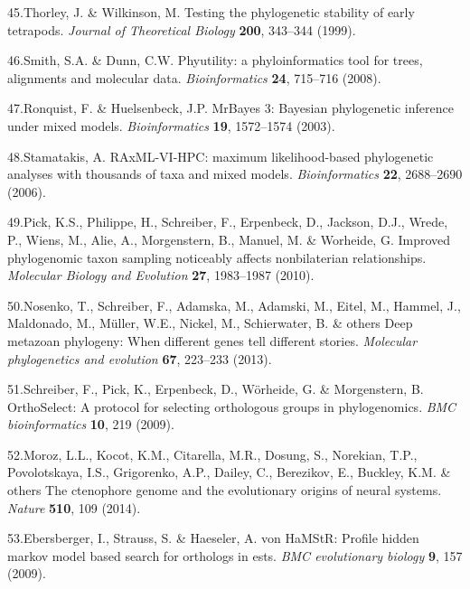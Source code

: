 \documentclass[]{article}
\begin{document}
\leavevmode\hypertarget{ref-Thorley:1999kg}{}%
45.Thorley, J. \& Wilkinson, M. Testing the phylogenetic stability of
early tetrapods. \emph{Journal of Theoretical Biology} \textbf{200},
343--344 (1999).

\leavevmode\hypertarget{ref-Smith:2008gb}{}%
46.Smith, S.A. \& Dunn, C.W. Phyutility: a phyloinformatics tool for
trees, alignments and molecular data. \emph{Bioinformatics} \textbf{24},
715--716 (2008).

\leavevmode\hypertarget{ref-Ronquist:2003hx}{}%
47.Ronquist, F. \& Huelsenbeck, J.P. MrBayes 3: Bayesian phylogenetic
inference under mixed models. \emph{Bioinformatics} \textbf{19},
1572--1574 (2003).

\leavevmode\hypertarget{ref-Stamatakis:2006wc}{}%
48.Stamatakis, A. RAxML-VI-HPC: maximum likelihood-based phylogenetic
analyses with thousands of taxa and mixed models. \emph{Bioinformatics}
\textbf{22}, 2688--2690 (2006).

\leavevmode\hypertarget{ref-Pick:2010eb}{}%
49.Pick, K.S., Philippe, H., Schreiber, F., Erpenbeck, D., Jackson,
D.J., Wrede, P., Wiens, M., Alie, A., Morgenstern, B., Manuel, M. \&
Worheide, G. Improved phylogenomic taxon sampling noticeably affects
nonbilaterian relationships. \emph{Molecular Biology and Evolution}
\textbf{27}, 1983--1987 (2010).

\leavevmode\hypertarget{ref-nosenko2013deep}{}%
50.Nosenko, T., Schreiber, F., Adamska, M., Adamski, M., Eitel, M.,
Hammel, J., Maldonado, M., Müller, W.E., Nickel, M., Schierwater, B. \&
others Deep metazoan phylogeny: When different genes tell different
stories. \emph{Molecular phylogenetics and evolution} \textbf{67},
223--233 (2013).

\leavevmode\hypertarget{ref-schreiber2009orthoselect}{}%
51.Schreiber, F., Pick, K., Erpenbeck, D., Wörheide, G. \& Morgenstern,
B. OrthoSelect: A protocol for selecting orthologous groups in
phylogenomics. \emph{BMC bioinformatics} \textbf{10}, 219 (2009).

\leavevmode\hypertarget{ref-moroz2014ctenophore}{}%
52.Moroz, L.L., Kocot, K.M., Citarella, M.R., Dosung, S., Norekian,
T.P., Povolotskaya, I.S., Grigorenko, A.P., Dailey, C., Berezikov, E.,
Buckley, K.M. \& others The ctenophore genome and the evolutionary
origins of neural systems. \emph{Nature} \textbf{510}, 109 (2014).

\leavevmode\hypertarget{ref-ebersberger2009hamstr}{}%
53.Ebersberger, I., Strauss, S. \& Haeseler, A. von HaMStR: Profile
hidden markov model based search for orthologs in ests. \emph{BMC
evolutionary biology} \textbf{9}, 157 (2009).
\end{document}
